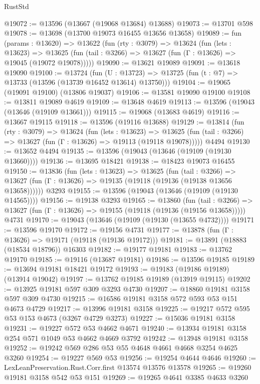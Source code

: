 \begin{lexlean}{RustStd}
\begin{coremodule}
@19072 := @13596 (@13667 (@19068 @13684) @13688)
@19073 := @13701 @598
@19078 := @13698 (@13700 @19073 @16455 @13656 @13658)
@19089 := fun (params : @13620) =>
  @13622
    (fun (rty : @3079) =>
    @13624
      (fun (lets : @13623) =>
      @13625 (fun (tail : @3266) => @13627 (fun (Γ : @13626) => @19045 (@19072 @19078)))))
@19090 := @13621 @19089
@19091 := @13618 @19090
@19100 := @13724
    (fun (U : @13723) => @13725 (fun (t : @7) => @13733 (@13596 (@13739 @16452 @13614) @13750)))
@19104 := @19065 (@19091 @19100) (@13806 @19037)
@19106 := @13581 @19090 @19100
@19108 := @13811 @19089 @4619
@19109 := @13648 @4619
@19113 := @13596 (@19043 (@13646 (@19109 @13661)))
@19115 := @19068 (@13683 @4619)
@19116 := @13667 @19115
@19118 := @13596 (@19116 @13688)
@19129 := @13814
    (fun (rty : @3079) =>
    @13624
      (fun (lets : @13623) =>
      @13625 (fun (tail : @3266) => @13627 (fun (Γ : @13626) => @19113 (@19118 @19078)))))
    @4494
@19130 := @13652 @4494
@19135 := @13596 (@19043 (@13646 (@19109 (@19130 @13660))))
@19136 := @13695 @18421
@19138 := @18423 @19073 @16455
@19150 := @13836
    (fun (lets : @13623) =>
    @13625
      (fun (tail : @3266) =>
      @13627 (fun (Γ : @13626) => @19135 (@19118 (@19136 (@19138 @13656 @13658))))))
    @3293
@19155 := @13596 (@19043 (@13646 (@19109 (@19130 @14565))))
@19156 := @19138 @3293
@19165 := @13860
    (fun (tail : @3266) => @13627 (fun (Γ : @13626) => @19155 (@19118 (@19136 (@19156 @13658)))))
    @4731
@19170 := @19043 (@13646 (@19109 (@19130 (@13655 @4732))))
@19171 := @13596 @19170
@19172 := @19156 @4731
@19177 := @13878 (fun (Γ : @13626) => @19171 (@19118 (@19136 @19172)))
@19181 := @13891 (@18883 (@18534 @18796)) @16303
@19182 := @19177 @19181
@19183 := @13762 @19170
@19185 := @19116 (@13687 @19181)
@19186 := @13596 @19185
@19189 := @13694 @19181 @18421 @19172
@19193 := @19183 (@19186 @19189) (@13914 @19042)
@19197 := @13762 @19185 @19189 (@13919 @19115)
@19202 := @13925 @19181 @597 @309 @3293 @4730
@19207 := @18860 @19181 @3158 @597 @309 @4730
@19215 := @16586 @19181 @3158 @572 @593 @53 @151 @4673 @4729
@19217 := @13996 @19181 @3158
@19225 := @19217 @572 @595 @53 @153 @4673 (@3267 @4729 @3273)
@19227 := @15036 @19181 @3158
@19231 := @19227 @572 @53 @4662 @4671
@19240 := @13934 @19181 @3158 @254 @571 @1049 @53 @4662 @4669 @3792
@19242 := @13948 @19181 @3158
@19252 := @19242 @569 @286 @53 @55 @4648 @4661 @4668 @3254 @4625 @3260
@19254 := @19227 @569 @53
@19256 := @19254 @4644 @4646
@19260 := LexLeanPreservation.Rust.Corr.first @13574 @13576 @13578
@19265 := @19260 @19181 @3158 @542 @53 @151
@19269 := @19265 @4641 @3385 @4633 @3260

\end{coremodule}
\end{lexlean}
